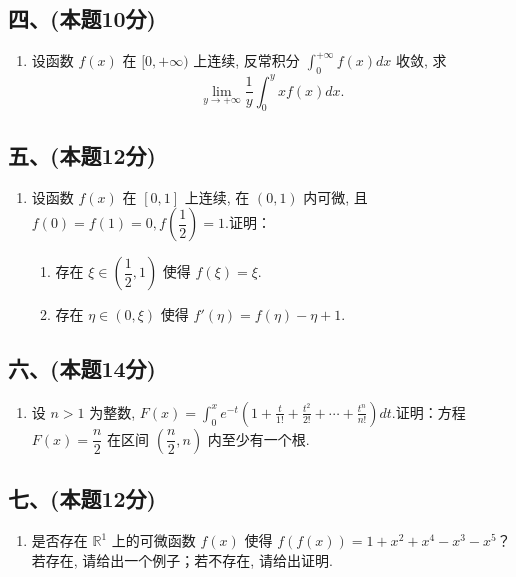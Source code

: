 \subsection*{四、(本题10分)}
\begin{enumerate}[start=8]
    \item 设函数 $f(x)$ 在 $[0,+\infty)$ 上连续, 反常积分 $\displaystyle\int_0^{+\infty}f(x)dx$ 收敛, 求
          \[
              \lim_{y\rightarrow+\infty}\frac{1}{y}\int_0^y xf(x)dx.
          \]
\end{enumerate}

\subsection*{五、(本题12分)}
\begin{enumerate}[start=9]
    \item 设函数 $f(x)$ 在 $[0,1]$ 上连续, 在 $(0,1)$ 内可微, 且 $f(0)=f(1)=0, f\left(\dfrac{1}{2}\right)=1$.证明：
          \begin{enumerate}
              \item[(1)] 存在 $\xi \in \left(\dfrac{1}{2},1\right)$ 使得 $f(\xi)=\xi$.
              \item[(2)] 存在 $\eta \in (0,\xi)$ 使得 $f'(\eta)=f(\eta)-\eta+1$.
          \end{enumerate}
\end{enumerate}

\subsection*{六、(本题14分)}
\begin{enumerate}[start=10]
    \item 设 $n > 1$ 为整数, $F(x) = \displaystyle\int_0^x e^{-t}\left(1+\frac{t}{1!}+\frac{t^2}{2!}+\cdots+\frac{t^n}{n!}\right)dt$.证明：方程 $F(x) = \dfrac{n}{2}$ 在区间 $\left(\dfrac{n}{2},n\right)$ 内至少有一个根.
\end{enumerate}

\subsection*{七、(本题12分)}
\begin{enumerate}[start=11]
    \item 是否存在 $\mathbb{R}^1$ 上的可微函数 $f(x)$ 使得 $f(f(x)) = 1 + x^2 + x^4 - x^3 - x^5$？若存在, 请给出一个例子；若不存在, 请给出证明.
\end{enumerate}

